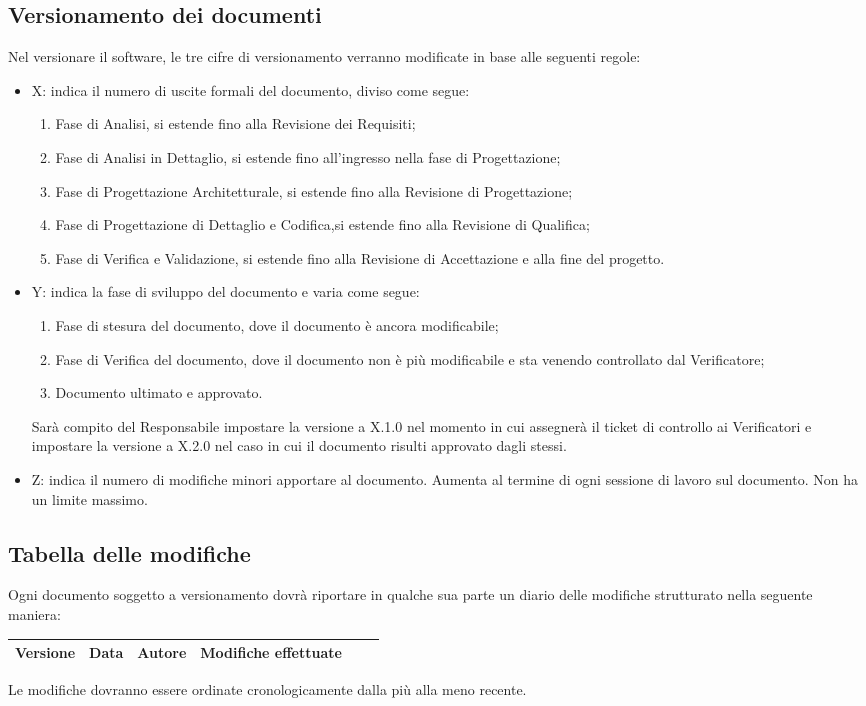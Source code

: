 \subsection{Versionamento dei documenti}
\label{6.3}
Nel versionare il software, le tre cifre di versionamento verranno modificate in base alle seguenti regole:
\begin{itemize}
\item X: indica il numero di uscite formali del documento, diviso come segue:
\begin{enumerate}
\item Fase di Analisi, si estende fino alla Revisione dei Requisiti;
\item Fase di Analisi in Dettaglio, si estende fino all'ingresso nella fase di Progettazione;
\item Fase di Progettazione Architetturale, si estende fino alla Revisione di Progettazione;
\item Fase di Progettazione di Dettaglio e Codifica,si estende fino alla Revisione di Qualifica;
\item Fase di Verifica e Validazione, si estende fino alla Revisione di Accettazione e alla fine del progetto.
\end{enumerate}
\item Y: indica la fase di sviluppo del documento e varia come segue:
\begin{enumerate}[start=0]
\item Fase di stesura del documento, dove il documento è ancora modificabile;
\item Fase di Verifica del documento, dove il documento non è più modificabile e sta venendo controllato dal Verificatore;
\item Documento ultimato e approvato.
\end{enumerate}
Sarà compito del Responsabile impostare la versione a X.1.0 nel momento in cui assegnerà il ticket di controllo ai Verificatori e impostare la versione a X.2.0 nel caso in cui il documento risulti approvato dagli stessi.
\item Z: indica il numero di modifiche minori apportare al documento. Aumenta al termine di ogni sessione di lavoro sul documento. Non ha un limite massimo.
\end{itemize}

\subsection{Tabella delle modifiche}
\label{6.4}
Ogni documento soggetto a versionamento dovrà riportare in qualche sua parte un diario delle modifiche strutturato nella seguente maniera:
\begin{center}
\begin{longtable}{|c|c|c|p{0.5\linewidth}|}
\toprule
\textbf{Versione} & \textbf{Data} & \textbf{Autore} & \textbf{Modifiche effettuate}\\

\bottomrule
\end{longtable}
\end{center}
Le modifiche dovranno essere ordinate cronologicamente dalla più alla meno recente.

